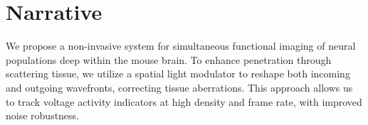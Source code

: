 \section*{Narrative}
We propose a non-invasive system for simultaneous functional imaging of neural populations deep within the mouse brain. To enhance penetration through scattering tissue, we utilize a spatial light modulator to reshape both incoming and outgoing wavefronts, correcting tissue aberrations. This approach allows us to track voltage activity indicators at high density and frame rate, with improved noise robustness.